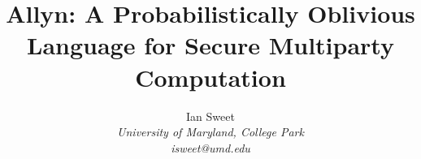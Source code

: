 \documentclass{report}
\newcommand{\lang}{Allyn\xspace}
\begin{document}
\title{\lang: A Probabilistically Oblivious Language for Secure Multiparty Computation}

\author{Ian Sweet \\
  \emph{University of Maryland, College Park} \\
  \emph{isweet@umd.edu}}

\date{}

\maketitle

\begin{abstract}  \end{abstract}

\tableofcontents








\appendix



\end{document}

